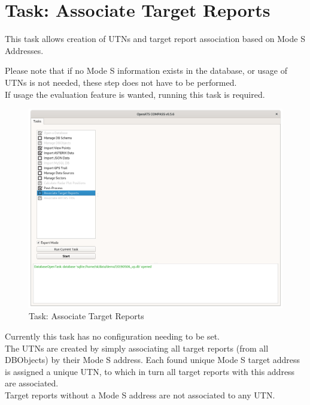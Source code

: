 \section{Task: Associate Target Reports}
\label{sec:task_associate_tr} 

This task allows creation of UTNs and target report association based on Mode S Addresses.

Please note that if no Mode S information exists in the database, or usage of UTNs is not needed, these step does not have to be performed. \\

If usage the evaluation feature is wanted, running this task is required.

\begin{figure}[H]
  \hspace*{-2.5cm}
    \includegraphics[width=19cm]{../screenshots/tr_association_config.png}
  \caption{Task: Associate Target Reports}
\end{figure}

Currently this task has no configuration needing to be set. \\

The UTNs are created by simply associating all target reports (from all DBObjects) by their Mode S address. Each found unique Mode S target address is assigned a unique UTN, to which in turn all target reports with this address are associated. \\

Target reports without a Mode S address are not associated to any UTN. \\

